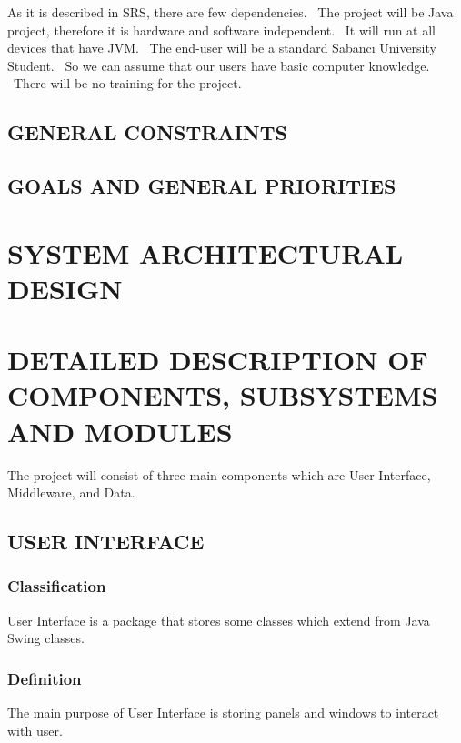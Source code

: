 \documentclass[twoside,letterpaper]{article}
\begin{document}
As it is described in SRS, there are few dependencies. \ The project will be Java project, therefore 
it is hardware and software independent. \  It will run at all devices that have JVM. \ The end-user 
will be a standard Sabanc\i{} University Student. \ So we can assume that our users have basic 
computer knowledge. \ There will be no training for the project. 

\subsection{GENERAL CONSTRAINTS}
\subsection{GOALS AND GENERAL PRIORITIES}

\clearpage\pagestyle{Standard}
\section{SYSTEM ARCHITECTURAL DESIGN}
\label{sec:architecture}

\clearpage\pagestyle{Standard}
\section{DETAILED DESCRIPTION OF COMPONENTS, SUBSYSTEMS AND MODULES}
\label{sec:description}

The project will consist of three main components which are User Interface, Middleware, and Data.

\subsection{USER INTERFACE}
\subsubsection{Classification}
User Interface is a package that stores some classes which extend from Java Swing classes. 
\subsubsection{Definition}
The main purpose of User Interface is storing panels and windows to interact with user.
\end{document}

